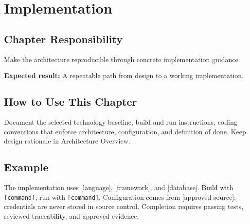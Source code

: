 \chapter{Implementation}
\section{Chapter Responsibility}
\label{Section:ImplementationResponsibility}
Make the architecture reproducible through concrete implementation guidance.

\noindent\textbf{Expected result:} A repeatable path from design to a working implementation.

\section{How to Use This Chapter}
Document the selected technology baseline, build and run instructions, coding conventions that enforce architecture, configuration, and definition of done. Keep design rationale in Architecture Overview.
\section{Example}
The implementation uses [language], [framework], and [database]. Build with \texttt{[command]}; run with \texttt{[command]}. Configuration comes from [approved source]; credentials are never stored in source control. Completion requires passing tests, reviewed traceability, and approved evidence.
